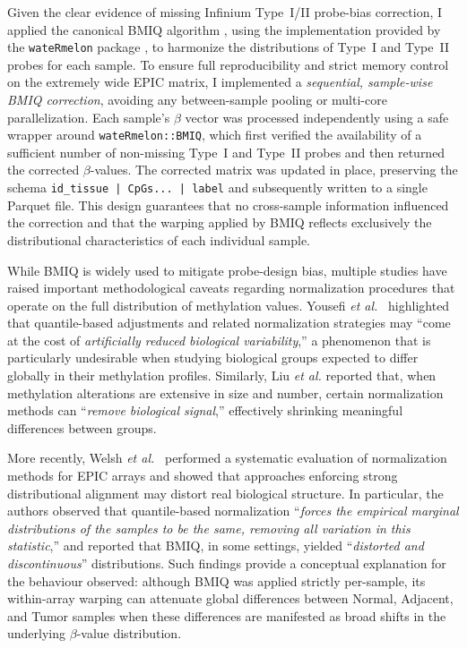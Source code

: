 \documentclass[10pt]{extarticle}
\begin{document}
Given the clear evidence of missing Infinium Type~I/II probe-bias correction, 
I applied the canonical BMIQ algorithm
\cite{Teschendorff2013BMIQ}, using the implementation provided by the 
\texttt{wateRmelon} package \cite{Pidsley2013wateRmelon}, to harmonize the 
distributions of Type~I and Type~II probes for each sample. To ensure full 
reproducibility and strict memory control on the extremely wide EPIC matrix, I implemented a \emph{sequential, sample-wise BMIQ correction}, 
avoiding any between-sample pooling or multi-core parallelization. Each sample’s 
$\beta$ vector was processed independently using a safe wrapper around 
\texttt{wateRmelon::BMIQ}, which first verified the availability of a sufficient 
number of non-missing Type~I and Type~II probes and then returned the corrected 
$\beta$-values. The corrected matrix was updated in place, preserving the schema 
\texttt{id\_tissue | CpGs... | label} and subsequently written to a single Parquet file. 
This design guarantees that no cross-sample information influenced the correction and 
that the warping applied by BMIQ reflects exclusively the distributional 
characteristics of each individual sample.

While BMIQ is widely used to mitigate probe-design bias, multiple studies have raised
important methodological caveats regarding normalization procedures that operate on
the full distribution of methylation values. Yousefi \textit{et al.}~\cite{Yousefi2013Normalization}
highlighted that quantile-based adjustments and related normalization strategies
may ``come at the cost of \emph{artificially reduced biological variability},'' 
a phenomenon that is particularly undesirable when studying biological groups expected 
to differ globally in their methylation profiles. Similarly, Liu \textit{et al.}
\cite{Liu2016Processing} reported that, when methylation alterations are extensive in size
and number, certain normalization methods can ``\emph{remove biological signal},'' 
effectively shrinking meaningful differences between groups. 

More recently, Welsh \textit{et al.}~\cite{Welsh2023EPICnorm} performed a systematic
evaluation of normalization methods for EPIC arrays and showed that approaches enforcing
strong distributional alignment may distort real biological structure. In particular,
the authors observed that quantile-based normalization ``\emph{forces the empirical 
marginal distributions of the samples to be the same, removing all variation in this
statistic},'' and reported that BMIQ, in some settings, yielded ``\emph{distorted and 
discontinuous}'' distributions. Such findings provide a conceptual explanation for the 
behaviour observed: although BMIQ was applied strictly 
per-sample, its within-array warping can attenuate global differences between 
Normal, Adjacent, and Tumor samples when these differences are manifested as broad 
shifts in the underlying $\beta$-value distribution.
\end{document}
